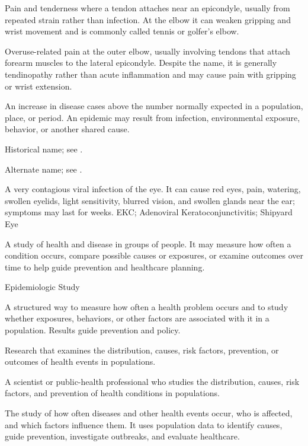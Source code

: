  Pain and tenderness where a tendon attaches near an epicondyle, usually from repeated strain rather than infection. At the elbow it can weaken gripping and wrist movement and is commonly called tennis or golfer’s elbow.


 Overuse-related pain at the outer elbow, usually involving tendons that attach forearm muscles to the lateral epicondyle. Despite the name, it is generally tendinopathy rather than acute inflammation and may cause pain with gripping or wrist extension.

 An increase in disease cases above the number normally expected in a population, place, or period. An epidemic may result from infection, environmental exposure, behavior, or another shared cause.

 Historical name; see .

 Alternate name; see .

 A very contagious viral infection of the eye. It can cause red eyes, pain, watering, swollen eyelids, light sensitivity, blurred vision, and swollen glands near the ear; symptoms may last for weeks.
\synonyms
EKC; Adenoviral Keratoconjunctivitis; Shipyard Eye

 A study of health and disease in groups of people. It may measure how often a condition occurs, compare possible causes or exposures, or examine outcomes over time to help guide prevention and healthcare planning.

\synonyms
Epidemiologic Study

 A structured way to measure how often a health problem occurs and to study whether exposures, behaviors, or other factors are associated with it in a population. Results guide prevention and policy.

 Research that examines the distribution, causes, risk factors, prevention, or outcomes of health events in populations.

 A scientist or public-health professional who studies the distribution, causes, risk factors, and prevention of health conditions in populations.

 The study of how often diseases and other health events occur, who is affected, and which factors influence them. It uses population data to identify causes, guide prevention, investigate outbreaks, and evaluate healthcare.


